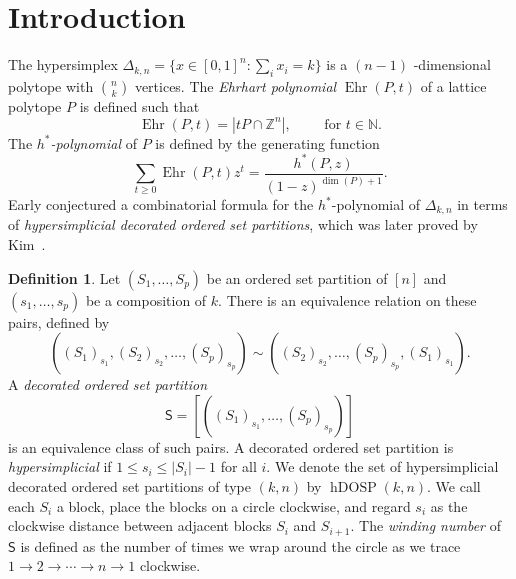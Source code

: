 \documentclass[12pt,reqno]{amsart}
\theoremstyle{plain}
\theoremstyle{definition}
\newtheorem{definition}[theorem]{Definition}
\newcommand{\Z}{\mathbb{Z}}
\newcommand{\N}{\mathbb{N}}
\newcommand{\hyp}{\Delta_{k,n}}
\newcommand{\dosp}{\mathsf{S}}
\DeclareMathOperator{\Ehr}{Ehr}
\DeclareMathOperator{\hDOSP}{hDOSP}
\begin{document}
\section{Introduction}
The hypersimplex $ \hyp = \{ x \in [0,1]^n: \sum_i x_i = k\} $ is a $ (n-1) $ -dimensional polytope with $ \binom{n}{k}
$ vertices. The \emph{Ehrhart polynomial} $ \Ehr(P,t) $ of a lattice polytope $ P $ is defined such that
\[
	\Ehr(P,t) = |tP \cap \Z^n|, \qquad \text{ for }t \in \N.
\]
The \emph{ $ h^* $-polynomial} of $ P $ is defined by the generating function
\[
	\sum_{t \ge 0} \Ehr(P,t) z^t = \frac{h^*(P,z)}{(1-z)^{\dim(P)+1}}.
\]
Early conjectured a combinatorial formula for the $ h^* $-polynomial of $ \hyp $ in terms of \emph{hypersimplicial
  decorated ordered set partitions}, which was later proved by Kim~\cite{Kim2020}.
\begin{definition}\label{def:dosp}
	Let $(S_1, \dots, S_p)$ be an ordered set partition of $ [n] $ and $(s_1, \dots, s_p)$ be a composition of $k$.
	There is an equivalence relation on these pairs, defined by
	\[
		((S_1)_{s_1},(S_2)_{s_2},\dots,(S_p)_{s_p}) \sim
		((S_2)_{s_2},\dots,(S_p)_{s_p},(S_1)_{s_1}).
	\]
	A \emph{decorated ordered set partition}
	\begin{equation}\label{eq:dosp}
		\dosp = [((S_1)_{s_1},\dots,(S_p)_{s_p})]
	\end{equation}
	is an equivalence class of such pairs.
	A decorated ordered set partition is \emph{hypersimplicial} if $ 1 \leq s_i \leq |S_i|-1 $ for all $ i $. We denote the set of hypersimplicial decorated
	ordered set partitions of type $ (k,n) $ by $ \hDOSP(k,n) $. We call each $ S_i $ a block, place the blocks on a
	circle clockwise, and regard $ s_i $ as the clockwise distance between adjacent blocks $ S_i $ and $ S_{i+1} $. The
	\emph{winding number} of $ \dosp $ is defined as the number of times we wrap around the circle as we trace $ 1 \to
		2 \to \cdots \to n \to 1 $ clockwise.
\end{definition}
\end{document}
